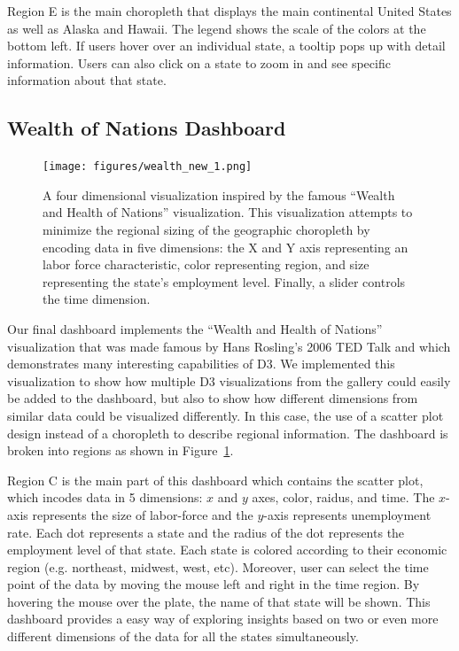 \documentclass{sigchi}
\begin{document}
Region E is the main choropleth that displays the main continental United States as well as Alaska and Hawaii. The legend shows the scale of the colors at the bottom left. If users hover over an individual state, a tooltip pops up with detail information. Users can also click on a state to zoom in and see specific information about that state.

\subsection{Wealth of Nations Dashboard}

\begin{figure}[!ht]
    \centering
    \texttt{[image: figures/wealth\_new\_1.png]}
    \caption{A four dimensional visualization inspired by the famous ``Wealth and Health of Nations'' visualization. This visualization attempts to minimize the regional sizing of the geographic choropleth by encoding data in five dimensions: the X and Y axis representing an labor force characteristic, color representing region, and size representing the state's employment level. Finally, a slider controls the time dimension.}
    \label{fig:wealth}
\end{figure}

Our final dashboard implements the ``Wealth and Health of Nations'' visualization that was made famous by Hans Rosling's 2006 TED Talk \cite{_wealth_????} and which demonstrates many interesting capabilities of D3. We implemented this visualization to show how multiple D3 visualizations from the gallery could easily be added to the dashboard, but also to show how different dimensions from similar data could be visualized differently. In this case, the use of a scatter plot design instead of a choropleth to describe regional information. The dashboard is broken into regions as shown in Figure~\ref{fig:wealth}.

Region C is the main part of this dashboard which contains the scatter plot, which incodes data in 5 dimensions: $x$ and $y$ axes, color, raidus, and time. The $x$-axis represents the size of labor-force and the $y$-axis represents unemployment rate. Each dot represents a state and the radius of the dot represents the employment level of that state. Each state is colored according to their economic region (e.g. northeast, midwest, west, etc). Moreover, user can select the time point of the data by moving the mouse left and right in the time region. By hovering the mouse over the plate, the name of that state will be shown. This dashboard provides a easy way of exploring insights based on two or even more different dimensions of the data for all the states simultaneously.
\end{document}
